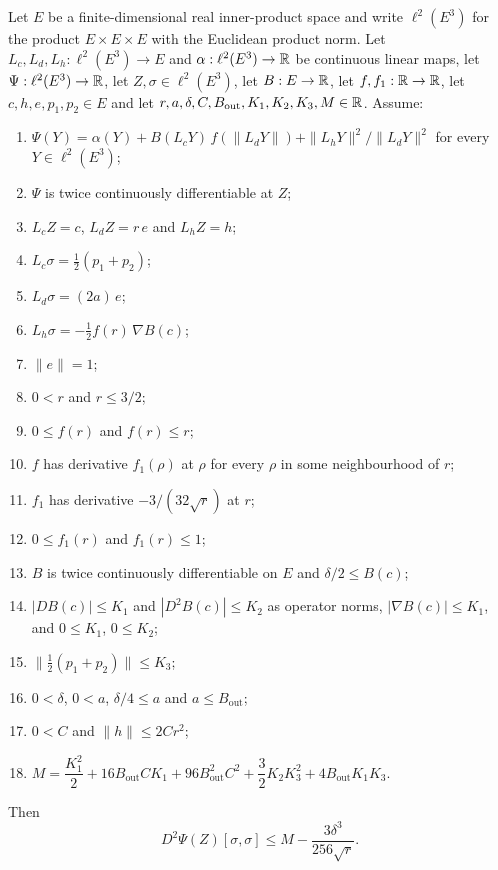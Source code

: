 \begin{lemma}
Let $E$ be a finite-dimensional real inner-product space and write
$\ell^2(E^3)$ for the product $E\times E\times E$ with the Euclidean product
norm. Let $L_c,L_d,L_h:\ell^2(E^3)\to E$ and $\alpha:\ell^2(E^3)\to\mathbb{R}$ be
continuous linear maps, let $\Psi:\ell^2(E^3)\to\mathbb{R}$, let
$Z,\sigma\in\ell^2(E^3)$, let $B:E\to\mathbb{R}$, let $f,f_1:\mathbb{R}\to\mathbb{R}$, let
$c,h,e,p_1,p_2\in E$ and let
$r,a,\delta,C,B_{\mathrm{out}},K_1,K_2,K_3,M\in\mathbb{R}$. Assume:
\begin{enumerate}
\item\label{it:tpsv-psi} $\Psi(Y)=\alpha(Y)+B(L_cY)\,f(\|L_dY\|)
+\|L_hY\|^2/\|L_dY\|^2$ for every $Y\in\ell^2(E^3)$;
\item\label{it:tpsv-C2} $\Psi$ is twice continuously differentiable at $Z$;
\item\label{it:tpsv-base} $L_cZ=c$, $L_dZ=r\,e$ and $L_hZ=h$;
\item\label{it:tpsv-cdot} $L_c\sigma=\tfrac12(p_1+p_2)$;
\item\label{it:tpsv-rdot} $L_d\sigma=(2a)\,e$;
\item\label{it:tpsv-hdot} $L_h\sigma=-\tfrac12f(r)\,\nabla B(c)$;
\item\label{it:tpsv-e} $\|e\|=1$;
\item\label{it:tpsv-r} $0<r$ and $r\le3/2$;
\item\label{it:tpsv-f} $0\le f(r)$ and $f(r)\le r$;
\item\label{it:tpsv-fder} $f$ has derivative $f_1(\rho)$ at $\rho$ for every
$\rho$ in some neighbourhood of $r$;
\item\label{it:tpsv-f2} $f_1$ has derivative $-3/(32\sqrt r)$ at $r$;
\item\label{it:tpsv-f1} $0\le f_1(r)$ and $f_1(r)\le1$;
\item\label{it:tpsv-B} $B$ is twice continuously differentiable on $E$ and
$\delta/2\le B(c)$;
\item\label{it:tpsv-DB} $|DB(c)|\le K_1$ and $|D^2B(c)|\le K_2$ as operator
norms, $|\nabla B(c)|\le K_1$, and $0\le K_1$, $0\le K_2$;
\item\label{it:tpsv-K3} $\|\tfrac12(p_1+p_2)\|\le K_3$;
\item\label{it:tpsv-a} $0<\delta$, $0<a$, $\delta/4\le a$ and
$a\le B_{\mathrm{out}}$;
\item\label{it:tpsv-h} $0<C$ and $\|h\|\le2Cr^2$;
\item\label{it:tpsv-M} $M=\dfrac{K_1^2}{2}+16B_{\mathrm{out}}CK_1
+96B_{\mathrm{out}}^2C^2+\dfrac32K_2K_3^2+4B_{\mathrm{out}}K_1K_3$.
\end{enumerate}
Then
\begin{equation}\label{eq:tpsv-neg}
  D^2\Psi(Z)[\sigma,\sigma]\le M-\frac{3\delta^3}{256\sqrt r}.
\end{equation}
\end{lemma}
